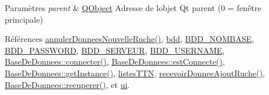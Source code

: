 \begin{DoxyParams}{Paramètres}
{\em parent} & \hyperlink{class_q_object}{Q\+Object} Adresse de l\textquotesingle{}objet Qt parent (0 = fenêtre principale) \\
\hline
\end{DoxyParams}


Références \hyperlink{class_nouvelle_ruche_ihm_a8967974b5606b7096960f3b607b5b58a}{annuler\+Donnees\+Nouvelle\+Ruche()}, \hyperlink{class_nouvelle_ruche_ihm_af552d9e6944c266060860d911878cff7}{bdd}, \hyperlink{parametres_8h_a45f8f15b8f9a7ab4c2b219038ff64f6b}{B\+D\+D\+\_\+\+N\+O\+M\+B\+A\+SE}, \hyperlink{parametres_8h_ae2ded9166ed2553182545e97514c04f7}{B\+D\+D\+\_\+\+P\+A\+S\+S\+W\+O\+RD}, \hyperlink{parametres_8h_a423559dc987673b8aacaa9f369839bb0}{B\+D\+D\+\_\+\+S\+E\+R\+V\+E\+UR}, \hyperlink{parametres_8h_a88b5f5b81fa534553c68802384beff2c}{B\+D\+D\+\_\+\+U\+S\+E\+R\+N\+A\+ME}, \hyperlink{class_base_de_donnees_ac20da193923a9bfea5e38ee5a54820cd}{Base\+De\+Donnees\+::connecter()}, \hyperlink{class_base_de_donnees_a00388973f3ec42e5c8e76e7af7e124b2}{Base\+De\+Donnees\+::est\+Connecte()}, \hyperlink{class_base_de_donnees_a80028aa2b6b4fbf30fb2e36357b7d3d3}{Base\+De\+Donnees\+::get\+Instance()}, \hyperlink{class_nouvelle_ruche_ihm_a0c97db3419bafe928aabed3aa01d46fb}{listes\+T\+TN}, \hyperlink{class_nouvelle_ruche_ihm_a268e781b033f2531ca5eab19cc828fdc}{recevoir\+Donnee\+Ajout\+Ruche()}, \hyperlink{class_base_de_donnees_a77539baad389f5acf754cd2cd452403e}{Base\+De\+Donnees\+::recuperer()}, et \hyperlink{class_nouvelle_ruche_ihm_a46c1f0446fc75c67847d152d89d75960}{ui}.



